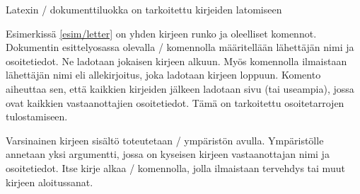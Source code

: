 \begin{esimerkki*}


  \caption{Latexin \-/ dokumenttiluokka on tarkoitettu
    kirjeiden latomiseen}
  \label{esim/letter}
\end{esimerkki*}

Esimerkissä \ref{esim/letter} on yhden kirjeen runko ja oleelliset
komennot. Dokumentin esittelyosassa olevalla \-/
komennolla määritellään lähettäjän nimi ja osoitetiedot. Ne ladotaan
jokaisen kirjeen alkuun. Myös komennolla  ilmaistaan
lähettäjän nimi eli allekirjoitus, joka ladotaan kirjeen loppuun.
Komento  aiheuttaa sen, että kaikkien kirjeiden
jälkeen ladotaan sivu (tai useampia), jossa ovat kaikkien
vastaanottajien osoitetiedot. Tämä on tarkoitettu osoitetarrojen
tulostamiseen.

Varsinainen kirjeen sisältö toteutetaan \-/ ympäristön
avulla. Ympäristölle annetaan yksi argumentti, jossa on kyseisen kirjeen
vastaanottajan nimi ja osoitetiedot. Itse kirje alkaa
\-/ komennolla, jolla ilmaistaan tervehdys tai muut
kirjeen aloitussanat.

